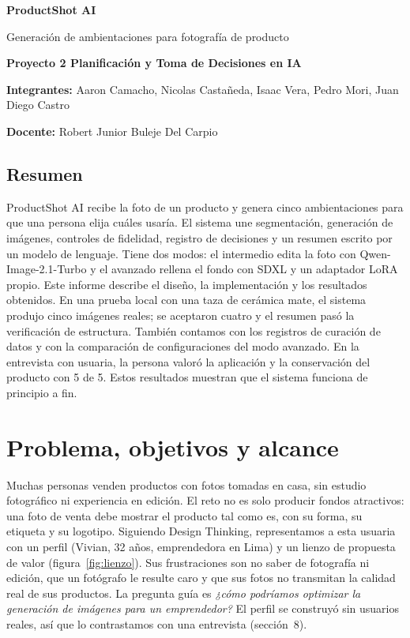 \documentclass[11pt,a4paper]{article}
\begin{document}
{\LARGE\bfseries\color{ink} ProductShot AI}\par
{\large Generación de ambientaciones para fotografía de producto}\par
\textbf{Proyecto 2 \textperiodcentered{} Planificación y Toma de Decisiones en IA}\par
\textbf{Integrantes:} Aaron Camacho, Nicolas Castañeda, Isaac Vera, Pedro Mori, Juan Diego Castro\par
\textbf{Docente:} Robert Junior Buleje Del Carpio\par

\subsection*{Resumen}
ProductShot AI recibe la foto de un producto y genera cinco ambientaciones para que una persona elija cuáles usaría. El sistema une segmentación, generación de imágenes, controles de fidelidad, registro de decisiones y un resumen escrito por un modelo de lenguaje. Tiene dos modos: el intermedio edita la foto con Qwen-Image-2.1-Turbo y el avanzado rellena el fondo con SDXL y un adaptador LoRA propio. Este informe describe el diseño, la implementación y los resultados obtenidos. En una prueba local con una taza de cerámica mate, el sistema produjo cinco imágenes reales; se aceptaron cuatro y el resumen pasó la verificación de estructura. También contamos con los registros de curación de datos y con la comparación de configuraciones del modo avanzado. En la entrevista con usuaria, la persona valoró la aplicación y la conservación del producto con 5 de 5. Estos resultados muestran que el sistema funciona de principio a fin.

\section{Problema, objetivos y alcance}
Muchas personas venden productos con fotos tomadas en casa, sin estudio fotográfico ni experiencia en edición. El reto no es solo producir fondos atractivos: una foto de venta debe mostrar el producto tal como es, con su forma, su etiqueta y su logotipo. Siguiendo Design Thinking, representamos a esta usuaria con un perfil (Vivian, 32 años, emprendedora en Lima) y un lienzo de propuesta de valor (figura~\ref{fig:lienzo}). Sus frustraciones son no saber de fotografía ni edición, que un fotógrafo le resulte caro y que sus fotos no transmitan la calidad real de sus productos. La pregunta guía es \emph{¿cómo podríamos optimizar la generación de imágenes para un emprendedor?} El perfil se construyó sin usuarios reales, así que lo contrastamos con una entrevista (sección~8).
\end{document}
